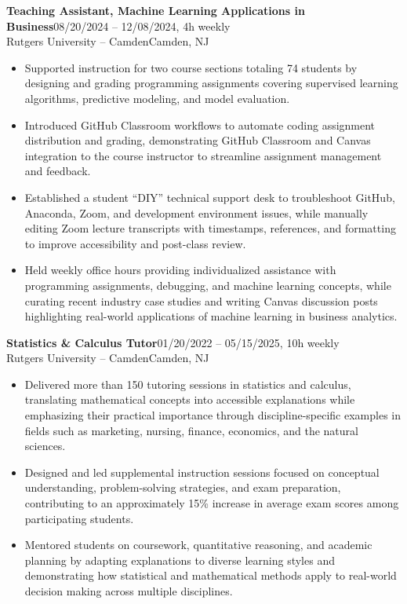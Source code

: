 \documentclass[11pt]{article}
\newcommand{\workentry}[4]{%
  \Needspace{7\baselineskip}%
  \textbf{#1}\hfill #2\\[-1pt]%
  #3\hfill #4\\[-8pt]%
}
\newenvironment{tightitemize}{%
  \vspace{-2pt}%
  \begin{itemize}[leftmargin=*,topsep=0pt,itemsep=1pt,parsep=0pt,partopsep=0pt]
}{%
  \end{itemize}\vspace{4pt}
}
\begin{document}
\workentry
{Teaching Assistant, Machine Learning Applications in Business}
{08/20/2024 -- 12/08/2024, 4h weekly}
{Rutgers University -- Camden}
{Camden, NJ}
\begin{tightitemize}
\item Supported instruction for two course sections totaling 74 students by designing and grading programming assignments covering supervised learning algorithms, predictive modeling, and model evaluation.
\item Introduced GitHub Classroom workflows to automate coding assignment distribution and grading, demonstrating GitHub Classroom and Canvas integration to the course instructor to streamline assignment management and feedback.
\item Established a student ``DIY'' technical support desk to troubleshoot GitHub, Anaconda, Zoom, and development environment issues, while manually editing Zoom lecture transcripts with timestamps, references, and formatting to improve accessibility and post-class review.
\item Held weekly office hours providing individualized assistance with programming assignments, debugging, and machine learning concepts, while curating recent industry case studies and writing Canvas discussion posts highlighting real-world applications of machine learning in business analytics.
\end{tightitemize}

\workentry
{Statistics \& Calculus Tutor}
{01/20/2022 -- 05/15/2025, 10h weekly}
{Rutgers University -- Camden}
{Camden, NJ}
\begin{tightitemize}
\item Delivered more than 150 tutoring sessions in statistics and calculus, translating mathematical concepts into accessible explanations while emphasizing their practical importance through discipline-specific examples in fields such as marketing, nursing, finance, economics, and the natural sciences.
\item Designed and led supplemental instruction sessions focused on conceptual understanding, problem-solving strategies, and exam preparation, contributing to an approximately 15\% increase in average exam scores among participating students.
\item Mentored students on coursework, quantitative reasoning, and academic planning by adapting explanations to diverse learning styles and demonstrating how statistical and mathematical methods apply to real-world decision making across multiple disciplines.
\end{tightitemize}
\end{document}
